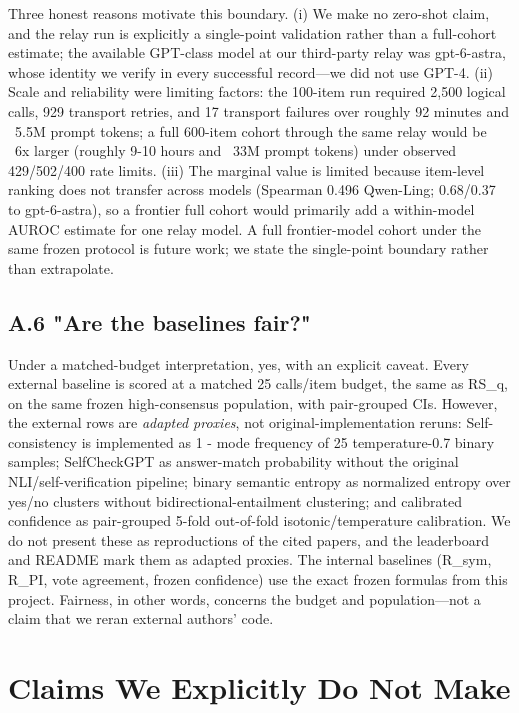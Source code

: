\documentclass[11pt]{article}
\begin{document}
Three honest reasons motivate this boundary. (i) We make no zero-shot claim, and the relay run is explicitly a single-point validation rather than a full-cohort estimate; the available GPT-class model at our third-party relay was gpt-6-astra, whose identity we verify in every successful record—we did not use GPT-4. (ii) Scale and reliability were limiting factors: the 100-item run required 2,500 logical calls, 929 transport retries, and 17 transport failures over roughly 92 minutes and ~5.5M prompt tokens; a full 600-item cohort through the same relay would be ~6x larger (roughly 9-10 hours and ~33M prompt tokens) under observed 429/502/400 rate limits. (iii) The marginal value is limited because item-level ranking does not transfer across models (Spearman 0.496 Qwen-Ling; 0.68/0.37 to gpt-6-astra), so a frontier full cohort would primarily add a within-model AUROC estimate for one relay model. A full frontier-model cohort under the same frozen protocol is future work; we state the single-point boundary rather than extrapolate.

\subsection{A.6 "Are the baselines fair?"}

Under a matched-budget interpretation, yes, with an explicit caveat. Every external baseline is scored at a matched 25 calls/item budget, the same as RS\_q, on the same frozen high-consensus population, with pair-grouped CIs. However, the external rows are \emph{adapted proxies}, not original-implementation reruns: Self-consistency is implemented as 1 - mode frequency of 25 temperature-0.7 binary samples; SelfCheckGPT as answer-match probability without the original NLI/self-verification pipeline; binary semantic entropy as normalized entropy over yes/no clusters without bidirectional-entailment clustering; and calibrated confidence as pair-grouped 5-fold out-of-fold isotonic/temperature calibration. We do not present these as reproductions of the cited papers, and the leaderboard and README mark them as adapted proxies. The internal baselines (R\_sym, R\_PI, vote agreement, frozen confidence) use the exact frozen formulas from this project. Fairness, in other words, concerns the budget and population—not a claim that we reran external authors' code.

\section{Claims We Explicitly Do Not Make}
\end{document}
